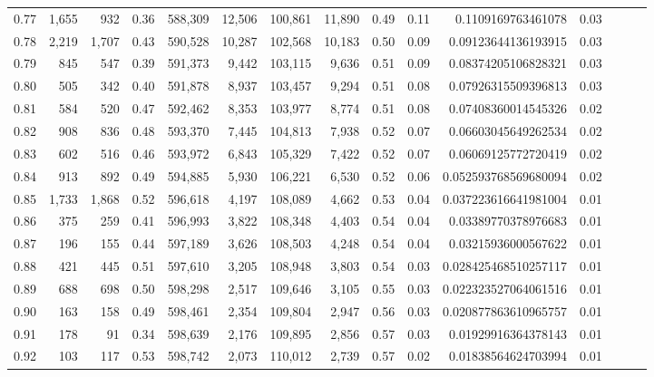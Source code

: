 \begin{tabular}{rrrrrrrrrrrrrrr}
0.77 &   1,655 &    932 &  0.36 &  588,309 &   12,506 &  100,861 &   11,890 &  0.49 &  0.11 &    0.1109169763461078 &      0.03 \\
0.78 &   2,219 &  1,707 &  0.43 &  590,528 &   10,287 &  102,568 &   10,183 &  0.50 &  0.09 &   0.09123644136193915 &      0.03 \\
0.79 &     845 &    547 &  0.39 &  591,373 &    9,442 &  103,115 &    9,636 &  0.51 &  0.09 &   0.08374205106828321 &      0.03 \\
0.80 &     505 &    342 &  0.40 &  591,878 &    8,937 &  103,457 &    9,294 &  0.51 &  0.08 &   0.07926315509396813 &      0.03 \\
0.81 &     584 &    520 &  0.47 &  592,462 &    8,353 &  103,977 &    8,774 &  0.51 &  0.08 &   0.07408360014545326 &      0.02 \\
0.82 &     908 &    836 &  0.48 &  593,370 &    7,445 &  104,813 &    7,938 &  0.52 &  0.07 &   0.06603045649262534 &      0.02 \\
0.83 &     602 &    516 &  0.46 &  593,972 &    6,843 &  105,329 &    7,422 &  0.52 &  0.07 &   0.06069125772720419 &      0.02 \\
0.84 &     913 &    892 &  0.49 &  594,885 &    5,930 &  106,221 &    6,530 &  0.52 &  0.06 &  0.052593768569680094 &      0.02 \\
0.85 &   1,733 &  1,868 &  0.52 &  596,618 &    4,197 &  108,089 &    4,662 &  0.53 &  0.04 &  0.037223616641981004 &      0.01 \\
0.86 &     375 &    259 &  0.41 &  596,993 &    3,822 &  108,348 &    4,403 &  0.54 &  0.04 &   0.03389770378976683 &      0.01 \\
0.87 &     196 &    155 &  0.44 &  597,189 &    3,626 &  108,503 &    4,248 &  0.54 &  0.04 &   0.03215936000567622 &      0.01 \\
0.88 &     421 &    445 &  0.51 &  597,610 &    3,205 &  108,948 &    3,803 &  0.54 &  0.03 &  0.028425468510257117 &      0.01 \\
0.89 &     688 &    698 &  0.50 &  598,298 &    2,517 &  109,646 &    3,105 &  0.55 &  0.03 &  0.022323527064061516 &      0.01 \\
0.90 &     163 &    158 &  0.49 &  598,461 &    2,354 &  109,804 &    2,947 &  0.56 &  0.03 &  0.020877863610965757 &      0.01 \\
0.91 &     178 &     91 &  0.34 &  598,639 &    2,176 &  109,895 &    2,856 &  0.57 &  0.03 &   0.01929916364378143 &      0.01 \\
0.92 &     103 &    117 &  0.53 &  598,742 &    2,073 &  110,012 &    2,739 &  0.57 &  0.02 &   0.01838564624703994 &      0.01 \\

\end{tabular}
